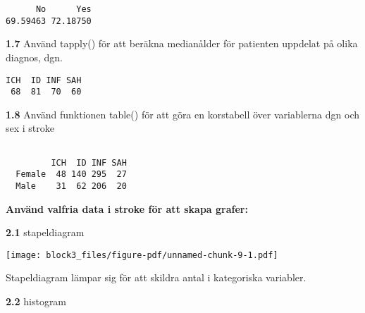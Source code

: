 \documentclass[
  letterpaper,
  DIV=11,
  numbers=noendperiod]{scrartcl}
\newenvironment{Shaded}{\begin{snugshade}}{\end{snugshade}}
\newcommand{\AttributeTok}[1]{\textcolor[rgb]{0.40,0.45,0.13}{#1}}
\newcommand{\ConstantTok}[1]{\textcolor[rgb]{0.56,0.35,0.01}{#1}}
\newcommand{\FunctionTok}[1]{\textcolor[rgb]{0.28,0.35,0.67}{#1}}
\newcommand{\NormalTok}[1]{\textcolor[rgb]{0.00,0.23,0.31}{#1}}
\newcommand{\SpecialCharTok}[1]{\textcolor[rgb]{0.37,0.37,0.37}{#1}}
\begin{document}
\begin{verbatim}
      No      Yes 
69.59463 72.18750 
\end{verbatim}

\textbf{1.7} Använd tapply() för att beräkna medianålder för patienten
uppdelat på olika diagnos, dgn.

\begin{Shaded}
\end{Shaded}

\begin{verbatim}
ICH  ID INF SAH 
 68  81  70  60 
\end{verbatim}

\textbf{1.8} Använd funktionen table() för att göra en korstabell över
variablerna dgn och sex i stroke

\begin{Shaded}
\end{Shaded}

\begin{verbatim}
        
         ICH  ID INF SAH
  Female  48 140 295  27
  Male    31  62 206  20
\end{verbatim}

\textbf{Använd valfria data i stroke för att skapa grafer:}

\textbf{2.1} stapeldiagram

\begin{Shaded}
\end{Shaded}

\texttt{[image: block3\_files/figure-pdf/unnamed-chunk-9-1.pdf]}

Stapeldiagram lämpar sig för att skildra antal i kategoriska variabler.

\textbf{2.2} histogram
\end{document}
